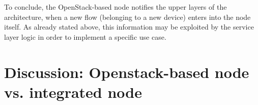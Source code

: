 {	

To conclude, the OpenStack-based node notifies the upper layers of the architecture, when a new flow (belonging to  a new device) enters into the node itself.
As already stated above, this information may be exploited by the service layer logic in order to implement a specific use case.
	
\section{Discussion: Openstack-based node vs. integrated node}


\renewcommand{\arraystretch}{1.5}
\begin{table}[tb]
	\centering
	\tiny


\end{table}}
